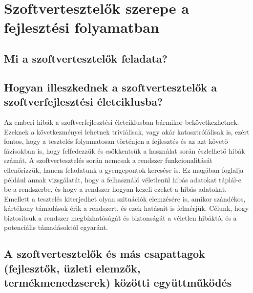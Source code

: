\section{Szoftvertesztelők szerepe a fejlesztési folyamatban}
\subsection{Mi a szoftvertesztelők feladata?}
\subsection{Hogyan illeszkednek a szoftvertesztelők a szoftverfejlesztési életciklusba?}
Az emberi hibák a szoftverfejlesztési életciklusban bármikor bekövetkezhetnek.
Ezeknek a következményei lehetnek triviálisak, vagy akár katasztrófálisak is, ezért fontos, hogy a tesztelés folyamatosan történjen a fejlesztés és az azt követő fázisokban is, hogy felfedezzük és csökkentsük a használat során észlelhető hibák számát.
A szoftvertesztelés során nemcsak a rendszer funkcionalitását ellenőrizzük, hanem feladatunk a gyengepontok keresése is. Ez magában foglalja például annak vizsgálatát, hogy a felhasználó véletlenül hibás adatokat táplál-e be a rendszerbe, és hogy a rendszer hogyan kezeli ezeket a hibás adatokat.
Emellett a tesztelés kiterjedhet olyan szituációk elemzésére is, amikor szándékos, kártékony támadások érik a rendszert, és ezek hatásait is felmérjük. Célunk, hogy biztosítsuk a rendszer megbízhatóságát és biztonságát a véletlen hibáktól és a potenciális támadásoktól egyaránt. \cite[9]{istqbfoundations}
\subsection{A szoftvertesztelők és más csapattagok (fejlesztők, üzleti elemzők, termékmenedzserek) közötti együttműködés}